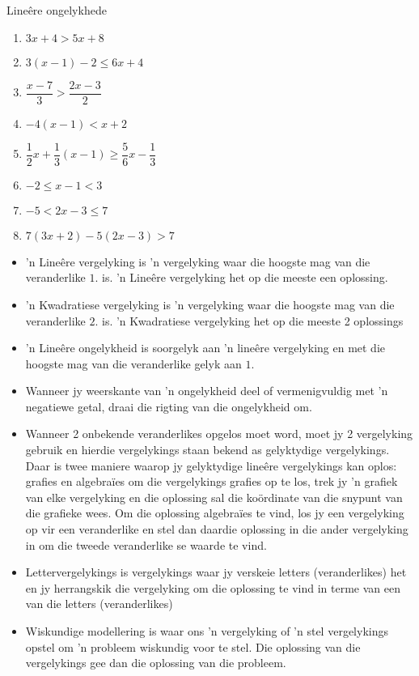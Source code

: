 \begin{aktiwiteit}{}
\begin{Aktiwiteit}{Line\^ere ongelykhede}
\begin{exercises}{ }
{\begin{enumerate}[noitemsep, label=\textbf{\arabic*}. ]
    \item $3x+4>5x+8$
    \item $3(x-1)-2\leq 6x+4$ \vspace{5pt}
    \item $\dfrac{x-7}{3}>\dfrac{2x-3}{2}$\vspace{5pt}
    \item $-4(x-1)<x+2$\vspace{5pt}
    \item $\dfrac{1}{2}x+\dfrac{1}{3}(x-1)\geq \dfrac{5}{6}x-\dfrac{1}{3}$ \vspace{5pt}
    \item $-2\leq x-1<3$ 
    \item $-5<2x-3\leq7$ 
\item $7(3x+2)-5(2x-3)>7$
    \end{enumerate}


}
\end{exercises}



\begin{itemize}[noitemsep]
\item ’n Lineêre vergelyking is ’n vergelyking waar die hoogste mag van die veranderlike $1$. is. ’n Lineêre vergelyking het op die meeste een oplossing.
\item ’n Kwadratiese vergelyking is ’n vergelyking waar die hoogste mag van die veranderlike $2$. is. ’n Kwadratiese
vergelyking het op die meeste 2 oplossings
\item ’n Lineêre ongelykheid is soorgelyk aan ’n lineêre vergelyking en met die hoogste mag van die veranderlike
gelyk aan $1$.
\item Wanneer jy weerskante van ’n ongelykheid deel of vermenigvuldig met ’n negatiewe getal,
draai die rigting van die ongelykheid om. 
\item Wanneer 2 onbekende veranderlikes opgelos moet word, moet jy 2 vergelyking gebruik en hierdie vergelykings staan bekend as gelyktydige vergelykings. Daar is twee maniere waarop jy gelyktydige lineêre
vergelykings kan oplos: grafies en algebraïes om die vergelykings grafies op te los, trek jy ’n grafiek
van elke vergelyking en die oplossing sal die koördinate van die snypunt van die grafieke wees. Om die
oplossing algebraïes te vind, los jy een vergelyking op vir een veranderlike en stel dan daardie oplossing
in die ander vergelyking in om die tweede veranderlike se waarde te vind.
\item Lettervergelykings is vergelykings waar jy verskeie letters (veranderlikes) het en jy herrangskik die vergelyking om die oplossing te vind in terme van een van die letters (veranderlikes)
\item Wiskundige modellering is waar ons ’n vergelyking of ’n stel vergelykings opstel om ’n probleem wiskundig
voor te stel. Die oplossing van die vergelykings gee dan die oplossing van die probleem.
\end{itemize}


\end{Aktiwiteit}
\end{aktiwiteit}
